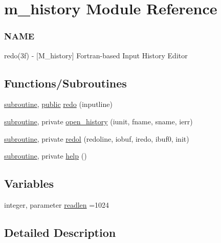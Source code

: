 \hypertarget{namespacem__history}{}\section{m\+\_\+history Module Reference}
\label{namespacem__history}


\subsubsection*{N\+A\+ME}

redo(3f) -\/ \mbox{[}M\+\_\+history\mbox{]} Fortran-\/based Input History Editor  


\subsection*{Functions/\+Subroutines}
\begin{DoxyCompactItemize}
\item 
\hyperlink{M__stopwatch_83_8txt_acfbcff50169d691ff02d4a123ed70482}{subroutine}, \hyperlink{M__stopwatch_83_8txt_a2f74811300c361e53b430611a7d1769f}{public} \hyperlink{namespacem__history_a1abbc2c426b89526939d4389c9d3e391}{redo} (inputline)
\item 
\hyperlink{M__stopwatch_83_8txt_acfbcff50169d691ff02d4a123ed70482}{subroutine}, private \hyperlink{namespacem__history_ac181d59688bc06d4ba7465841721e766}{open\+\_\+history} (iunit, fname, sname, ierr)
\item 
\hyperlink{M__stopwatch_83_8txt_acfbcff50169d691ff02d4a123ed70482}{subroutine}, private \hyperlink{namespacem__history_a155404b1f975ae6fe778f836c043eeb2}{redol} (redoline, iobuf, iredo, ibuf0, init)
\item 
\hyperlink{M__stopwatch_83_8txt_acfbcff50169d691ff02d4a123ed70482}{subroutine}, private \hyperlink{namespacem__history_a8d0830530f10435242fa57853baad282}{help} ()
\end{DoxyCompactItemize}
\subsection*{Variables}
\begin{DoxyCompactItemize}
\item 
integer, parameter \hyperlink{namespacem__history_aca543c267d8b80d0690c33e4a684143b}{readlen} =1024
\end{DoxyCompactItemize}


\subsection{Detailed Description}
